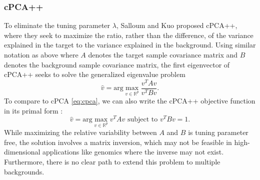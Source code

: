 \documentclass[10pt]{article}
\begin{document}
\subsubsection{cPCA++}
To eliminate the tuning parameter $\lambda$, Salloum and Kuo  \cite{Salloum} proposed cPCA++, where they seek to maximize the ratio, rather than the difference, of the variance explained in the target to the variance explained in the background.
Using similar notation as above where $A$ denotes the target sample covariance matrix and $B$ denotes the background sample covariance matrix, the first eigenvector of cPCA++ seeks to solve the generalized eigenvalue problem
\[\hat{v} = \text{arg}\max_{v\in \mathbb{R}^p} \frac{v^T A v}{v^T B v}.\]
To compare to cPCA \eqref{eq:cpca}, we can also write the cPCA++ objective function in its primal form \cite{ghojogh2019eigenvalue}:
\begin{equation}
  \label{eq:cpca++}
  \hat{v} = \text{arg}\max_{v \in \mathbb{R}^p}{v^T A v}  \mbox{ subject to } v^T B v = 1.
\end{equation}
While maximizing the relative variability between $A$ and $B$ is tuning parameter free, the solution involves a matrix inversion, which may not be feasible in high-dimensional applications like genomics where the inverse may not exist.  Furthermore, there is no clear path to extend this problem to multiple backgrounds.
\end{document}
